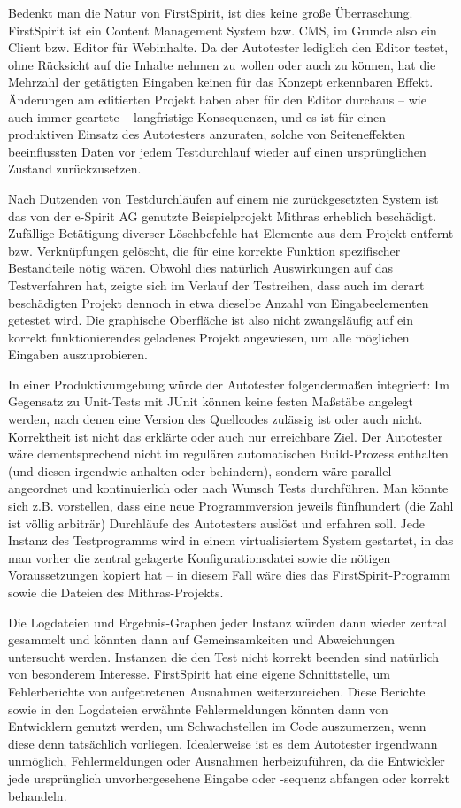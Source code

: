 Bedenkt man die Natur von FirstSpirit, ist dies keine große Überraschung.
FirstSpirit ist ein Content Management System bzw. CMS, im Grunde also
ein Client bzw. Editor für Webinhalte. Da der Autotester lediglich den Editor testet,
ohne Rücksicht auf die Inhalte nehmen zu wollen oder auch zu können,
hat die Mehrzahl der getätigten Eingaben keinen für das Konzept erkennbaren
Effekt. Änderungen am editierten Projekt haben aber für den Editor durchaus
-- wie auch immer geartete -- langfristige Konsequenzen, und es ist für
einen produktiven Einsatz des Autotesters anzuraten, solche von Seiteneffekten
beeinflussten Daten vor jedem Testdurchlauf wieder auf einen ursprünglichen
Zustand zurückzusetzen.

Nach Dutzenden von Testdurchläufen auf einem nie zurückgesetzten System
ist das von der e-Spirit AG genutzte Beispielprojekt \glqq{}Mithras\grqq{}
erheblich beschädigt. Zufällige Betätigung diverser Löschbefehle hat
Elemente aus dem Projekt entfernt bzw. Verknüpfungen gelöscht, die für
eine korrekte Funktion spezifischer Bestandteile nötig wären. Obwohl
dies natürlich Auswirkungen auf das Testverfahren hat, zeigte sich im 
Verlauf der Testreihen, dass auch im derart beschädigten Projekt 
dennoch in etwa dieselbe Anzahl von Eingabeelementen getestet wird.
Die graphische Oberfläche ist also nicht zwangsläufig auf ein korrekt funktionierendes
geladenes Projekt angewiesen, um alle möglichen Eingaben auszuprobieren.

In einer Produktivumgebung würde der Autotester folgendermaßen integriert:
Im Gegensatz zu Unit-Tests mit JUnit können keine festen Maßstäbe angelegt
werden, nach denen eine Version des Quellcodes zulässig ist oder auch nicht.
Korrektheit ist nicht das erklärte oder auch nur erreichbare Ziel.
Der Autotester wäre dementsprechend nicht im regulären automatischen
Build-Prozess enthalten (und diesen irgendwie anhalten oder behindern),
sondern wäre parallel angeordnet und kontinuierlich oder nach Wunsch
Tests durchführen. Man könnte sich z.B. vorstellen, dass eine neue
Programmversion jeweils fünfhundert (die Zahl ist völlig arbiträr) Durchläufe
des Autotesters auslöst und erfahren soll. Jede Instanz des Testprogramms wird
in einem virtualisiertem System gestartet, in das man vorher die
zentral gelagerte Konfigurationsdatei sowie die nötigen Voraussetzungen
kopiert hat -- in diesem Fall wäre dies das FirstSpirit-Programm sowie
die Dateien des Mithras-Projekts.

Die Logdateien und Ergebnis-Graphen jeder Instanz würden dann wieder zentral
gesammelt und könnten dann auf Gemeinsamkeiten und Abweichungen untersucht
werden. Instanzen die den Test nicht korrekt beenden sind natürlich von besonderem
Interesse. FirstSpirit hat eine eigene Schnittstelle, um Fehlerberichte von
aufgetretenen Ausnahmen weiterzureichen. Diese Berichte sowie in den Logdateien
erwähnte Fehlermeldungen könnten dann von Entwicklern genutzt werden, um
Schwachstellen im Code auszumerzen, wenn diese denn tatsächlich vorliegen.
Idealerweise ist es dem Autotester irgendwann unmöglich, Fehlermeldungen
oder Ausnahmen herbeizuführen, da die Entwickler jede ursprünglich 
unvorhergesehene Eingabe oder -sequenz abfangen oder korrekt behandeln.


